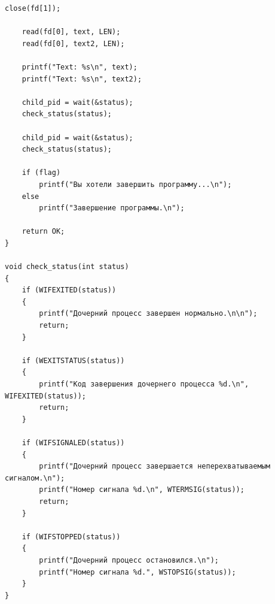 \begin{lstlisting}[label=some-code,caption=Программа 5.]
	close(fd[1]);

	read(fd[0], text, LEN);
	read(fd[0], text2, LEN);

	printf("Text: %s\n", text);
	printf("Text: %s\n", text2);

	child_pid = wait(&status);
	check_status(status);

	child_pid = wait(&status);
	check_status(status);

	if (flag)
		printf("Вы хотели завершить программу...\n");
	else
		printf("Завершение программы.\n");

	return OK;
}

void check_status(int status)
{
	if (WIFEXITED(status))
	{
		printf("Дочерний процесс завершен нормально.\n\n");
		return;
	}

	if (WEXITSTATUS(status))
	{
		printf("Код завершения дочернего процесса %d.\n", WIFEXITED(status));
		return;
	}

	if (WIFSIGNALED(status))
	{
		printf("Дочерний процесс завершается неперехватываемым сигналом.\n");
		printf("Номер сигнала %d.\n", WTERMSIG(status));
		return;
	}

	if (WIFSTOPPED(status))
	{
		printf("Дочерний процесс остановился.\n");
		printf("Номер сигнала %d.", WSTOPSIG(status));
	}
}
\end{lstlisting}


\begin{figure}[ht!]
\end{figure}
